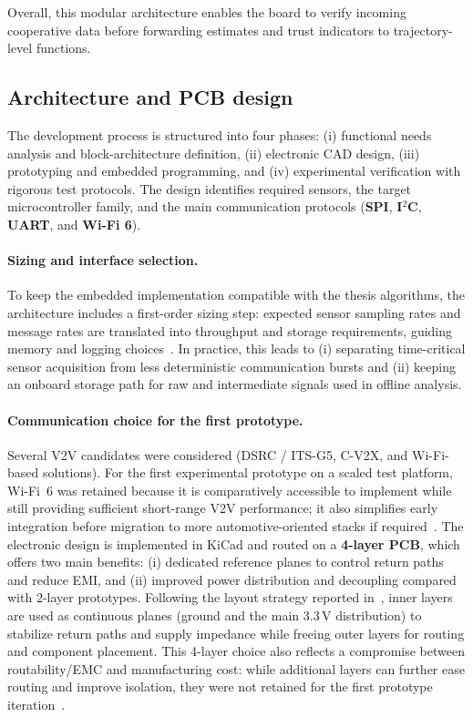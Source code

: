 Overall, this modular architecture enables the board to verify incoming cooperative data before forwarding estimates and trust indicators to trajectory-level functions.


\subsection{Architecture and PCB design}\label{chp6_subsec_board_hw}
The development process is structured into four phases: (i) functional needs analysis and block-architecture definition, (ii) electronic CAD design, (iii) prototyping and embedded programming, and (iv) experimental verification with rigorous test protocols.
The design identifies required sensors, the target microcontroller family, and the main communication protocols (\textbf{SPI}, \textbf{I$^2$C}, \textbf{UART}, and \textbf{Wi-Fi 6}).
\paragraph{Sizing and interface selection.}
To keep the embedded implementation compatible with the thesis algorithms, the architecture includes a first-order sizing step: expected sensor sampling rates and message rates are translated into throughput and storage requirements, guiding memory and logging choices~\cite{chaix2026vehalsecu}.
In practice, this leads to (i) separating time-critical sensor acquisition from less deterministic communication bursts and (ii) keeping an onboard storage path for raw and intermediate signals used in offline analysis.

\paragraph{Communication choice for the first prototype.}
Several V2V candidates were considered (DSRC / ITS-G5, C-V2X, and Wi-Fi-based solutions).
For the first experimental prototype on a scaled test platform, Wi-Fi~6 was retained because it is comparatively accessible to implement while still providing sufficient short-range V2V performance; it also simplifies early integration before migration to more automotive-oriented stacks if required~\cite{chaix2026vehalsecu}.
The electronic design is implemented in KiCad and routed on a \textbf{4-layer PCB}, which offers two main benefits: (i) dedicated reference planes to control return paths and reduce EMI, and (ii) improved power distribution and decoupling compared with 2-layer prototypes.
Following the layout strategy reported in~\cite{chaix2026vehalsecu}, inner layers are used as continuous planes (ground and the main $3.3\,\mathrm{V}$ distribution) to stabilize return paths and supply impedance while freeing outer layers for routing and component placement.
This 4-layer choice also reflects a compromise between routability/EMC and manufacturing cost: while additional layers can further ease routing and improve isolation, they were not retained for the first prototype iteration~\cite{chaix2026vehalsecu}.


